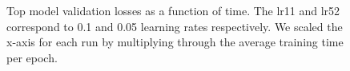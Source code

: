 \documentclass[12pt,journal,compsoc]{IEEEtran}
\begin{document}
\begin{figure}%
\caption{Top model validation losses as a function of time. The lr11 and lr52 correspond to 0.1 and 0.05 learning rates respectively.  We scaled the x-axis for each run by multiplying through the average training time per epoch.}
\label{fig:top3_sz_lr_bs}
\vspace*{4pt}
\end{figure}










\end{document}
